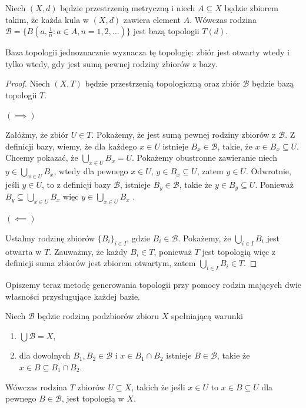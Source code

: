\begin{eg}[1.2.5]
	Niech $\left( X,d \right) $ będzie przestrzenią metryczną i niech $A\subseteq X$ będzie zbiorem takim, że każda kula w $\left( X,d \right) $ zawiera element $A$. Wówczas rodzina $\mathcal{B} = \{B\left( a, \frac{1}{n}: a\in A, n = 1,2,\ldots \right) \} $ jest bazą topologii $T\left( d \right) $.
\end{eg} 
\begin{remark}
	Baza topologii jednoznacznie wyznacza tę topologię: zbiór jest otwarty wtedy i tylko wtedy, gdy jest sumą pewnej rodziny zbiorów z bazy.
\end{remark} 
\begin{proof}
	Niech $\left( X,T \right) $ będzie przestrzenią topologiczną oraz zbiór $\mathcal{B}$ będzie bazą topologii $T$.

	\noindent $\left( \implies \right) $

	Załóżmy, że zbiór $U \in T$. Pokażemy, że jest sumą pewnej rodziny zbiorów z $\mathcal{B}$. Z definicji bazy, wiemy, że dla każdego $x \in U$ istnieje $B_{x} \in \mathcal{B}$, takie, że $x \in B_{x}\subseteq U$. Chcemy pokazać, że $\bigcup_{x \in U} B_{x} = U$. Pokażemy obustronne zawieranie niech $y \in \bigcup_{x \in U} B_{x}$, wtedy dla pewnego $x \in U$, $y \in B_{x}\subseteq U$, zatem $y \in U$. Odwrotnie, jeśli $y \in U$, to z definicji bazy $\mathcal{B}$, istnieje $B_{y} \in \mathcal{B}$, takie że $y \in B_{y} \subseteq U$. Ponieważ $B_{y}\subseteq \bigcup_{x\in U} B_{x}$ więc $y \in \bigcup_{x \in U} B_{x}$ .

	\noindent $\left( \impliedby \right) $

Ustalmy rodzinę zbiorów $\{B_{i}\}_{i \in I} $, gdzie $B_{i}\in \mathcal{B}$. Pokażemy, że $\bigcup_{i \in  I} B_{i}$ jest otwarta w $T$. Zauważmy, że każdy  $B_{i} \in T$, ponieważ $T$ jest topologią więc z definicji suma zbiorów jest zbiorem otwartym, zatem $\bigcup_{i \in  I} B_{i} \in T$.
\end{proof} 
Opiszemy teraz metodę generowania topologii przy pomocy rodzin mających dwie własności przysługujące każdej bazie.
\begin{theorem}[1.2.6.]
	Niech $\mathcal{B}$ będzie rodziną podzbiorów  zbioru $X$ spełniającą warunki
	\begin{enumerate}[label=\arabic*)]
		\item $\bigcup \mathcal{B} = X$,
		\item dla dowolnych $B_1, B_2 \in \mathcal{B}$ i $x \in B_1\cap B_2$ istnieje $B\in \mathcal{B}$, takie że $x \in B \subseteq B_1\cap B_2$.
	\end{enumerate}
	Wówczas rodzina $T$ zbiorów $U \subseteq X$, takich że jeśli $x \in U$ to $x \in B \subseteq U$ dla pewnego $B\in \mathcal{B}$, jest topologią w $X$.
\end{theorem} 
